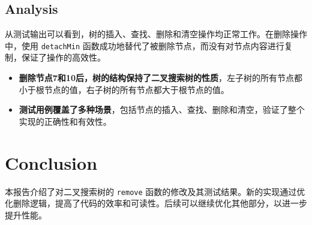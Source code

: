 \documentclass{article}
\begin{document}
\subsection{Analysis}
从测试输出可以看到，树的插入、查找、删除和清空操作均正常工作。在删除操作中，使用 \texttt{detachMin} 函数成功地替代了被删除节点，而没有对节点内容进行复制，保证了操作的高效性。

\begin{itemize}

\item \textbf{删除节点7和10后，树的结构保持了二叉搜索树的性质}，左子树的所有节点都小于根节点的值，右子树的所有节点都大于根节点的值。

\item \textbf{测试用例覆盖了多种场景}，包括节点的插入、查找、删除和清空，验证了整个实现的正确性和有效性。

\end{itemize}

\section{Conclusion}
本报告介绍了对二叉搜索树的 \texttt{remove} 函数的修改及其测试结果。新的实现通过优化删除逻辑，提高了代码的效率和可读性。后续可以继续优化其他部分，以进一步提升性能。
\end{document}
